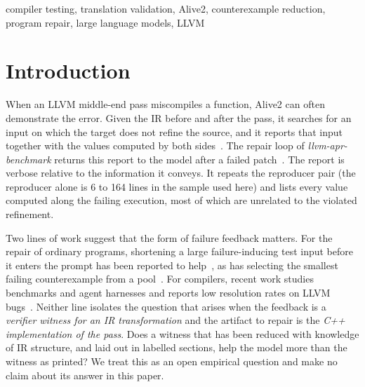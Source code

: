 \documentclass[conference]{IEEEtran}
\begin{document}
\begin{IEEEkeywords}
compiler testing, translation validation, Alive2, counterexample reduction, program repair, large language models, LLVM
\end{IEEEkeywords}

\section{Introduction}

When an LLVM middle-end pass miscompiles a function, Alive2 can often demonstrate the error. Given the IR before and after the pass, it searches for an input on which the target does not refine the source, and it reports that input together with the values computed by both sides~\cite{lopes2021alive2}. The repair loop of \emph{llvm-apr-benchmark} returns this report to the model after a failed patch~\cite{zheng2025aprbench}. The report is verbose relative to the information it conveys. It repeats the reproducer pair (the reproducer alone is 6 to 164 lines in the sample used here) and lists every value computed along the failing execution, most of which are unrelated to the violated refinement.

Two lines of work suggest that the form of failure feedback matters. For the repair of ordinary programs, shortening a large failure-inducing test input before it enters the prompt has been reported to help~\cite{yang2026reducefix}, as has selecting the smallest failing counterexample from a pool~\cite{he2026pgs}. For compilers, recent work studies benchmarks and agent harnesses and reports low resolution rates on LLVM bugs~\cite{zheng2026harness,tian2026llvmbench}. Neither line isolates the question that arises when the feedback is a \emph{verifier witness for an IR transformation} and the artifact to repair is the \emph{C++ implementation of the pass}. Does a witness that has been reduced with knowledge of IR structure, and laid out in labelled sections, help the model more than the witness as printed? We treat this as an open empirical question and make no claim about its answer in this paper.
\end{document}
